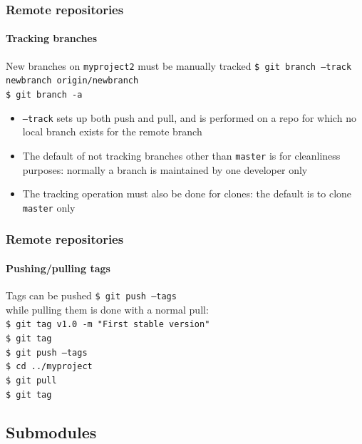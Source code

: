 \begin{frame}
\frametitle{Remote repositories}
\framesubtitle{Tracking branches}

\begin{block}{New branches on \texttt{myproject2} must be manually tracked}
\texttt{\$ git branch ---track newbranch origin/newbranch} \\
\texttt{\$ git branch -a} \\
\begin{itemize}
\item \texttt{---track} sets up both push and pull, and is performed on a repo for which no local branch exists for the remote branch
\item The default of not tracking branches other than \texttt{master} is for cleanliness purposes: normally a branch is maintained by one developer only
\item The tracking operation must also be done for clones: the default is to clone \texttt{master} only
\end{itemize}
\end{block}

\end{frame}

\begin{frame}
\frametitle{Remote repositories}
\framesubtitle{Pushing/pulling tags}

\begin{block}{Tags can be pushed}
\texttt{\$ git push ---tags} \\

\medskip
while pulling them is done with a normal pull: \\

\texttt{\$ git tag v1.0 -m "First stable version"} \\
\texttt{\$ git tag} \\
\texttt{\$ git push ---tags} \\
\texttt{\$ cd ../myproject} \\
\texttt{\$ git pull} \\
\texttt{\$ git tag}
\end{block}

\end{frame}

\subsection{Submodules}

